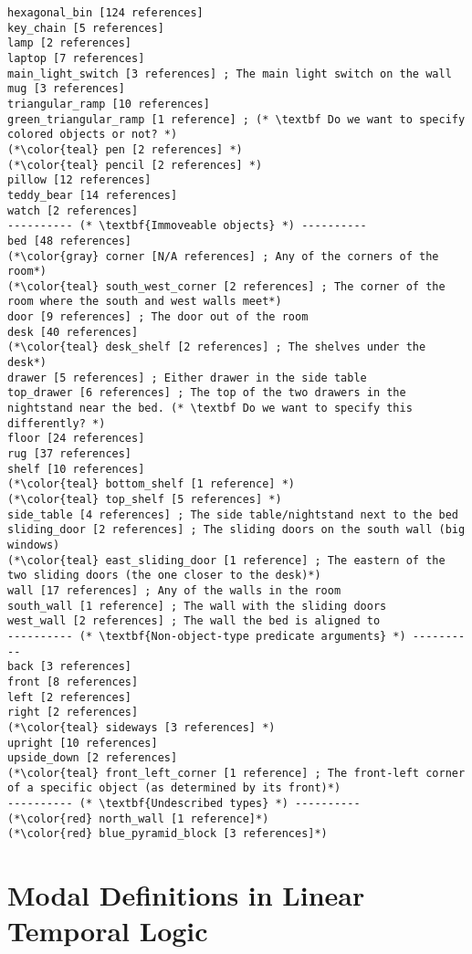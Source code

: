 \documentclass{article}
\begin{document}
\begin{lstlisting}
hexagonal_bin [124 references] 
key_chain [5 references] 
lamp [2 references] 
laptop [7 references] 
main_light_switch [3 references] ; The main light switch on the wall
mug [3 references] 
triangular_ramp [10 references] 
green_triangular_ramp [1 reference] ; (* \textbf Do we want to specify colored objects or not? *)
(*\color{teal} pen [2 references] *)
(*\color{teal} pencil [2 references] *)
pillow [12 references] 
teddy_bear [14 references] 
watch [2 references] 
---------- (* \textbf{Immoveable objects} *) ----------
bed [48 references] 
(*\color{gray} corner [N/A references] ; Any of the corners of the room*)
(*\color{teal} south_west_corner [2 references] ; The corner of the room where the south and west walls meet*)
door [9 references] ; The door out of the room
desk [40 references] 
(*\color{teal} desk_shelf [2 references] ; The shelves under the desk*)
drawer [5 references] ; Either drawer in the side table
top_drawer [6 references] ; The top of the two drawers in the nightstand near the bed. (* \textbf Do we want to specify this differently? *)
floor [24 references] 
rug [37 references] 
shelf [10 references] 
(*\color{teal} bottom_shelf [1 reference] *)
(*\color{teal} top_shelf [5 references] *)
side_table [4 references] ; The side table/nightstand next to the bed
sliding_door [2 references] ; The sliding doors on the south wall (big windows)
(*\color{teal} east_sliding_door [1 reference] ; The eastern of the two sliding doors (the one closer to the desk)*)
wall [17 references] ; Any of the walls in the room
south_wall [1 reference] ; The wall with the sliding doors
west_wall [2 references] ; The wall the bed is aligned to
---------- (* \textbf{Non-object-type predicate arguments} *) ----------
back [3 references] 
front [8 references] 
left [2 references] 
right [2 references] 
(*\color{teal} sideways [3 references] *)
upright [10 references] 
upside_down [2 references] 
(*\color{teal} front_left_corner [1 reference] ; The front-left corner of a specific object (as determined by its front)*)
---------- (* \textbf{Undescribed types} *) ----------
(*\color{red} north_wall [1 reference]*)
(*\color{red} blue_pyramid_block [3 references]*)
\end{lstlisting}




\section{Modal Definitions in Linear Temporal Logic}
\end{document}
